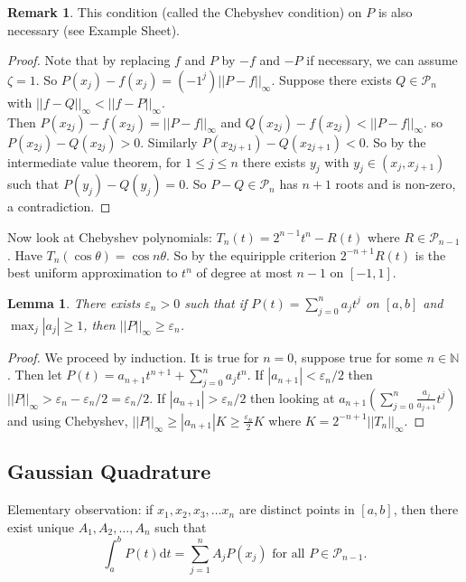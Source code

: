\documentclass[a4paper, 10pt, twocolumn]{amsart}
\newtheorem*{lemma}{Lemma}
\theoremstyle{definition}
\newtheorem*{remark}{Remark}
\newcommand{\bb}[1]{\mathbb{#1}}
\newcommand{\eps}[0]{\varepsilon}
\renewcommand{\cal}[1]{\mathcal{#1}}
\newcommand{\1}{\mathbbm{1}}
\begin{document}
\begin{remark}
    This condition (called the Chebyshev condition) on $P$ is also necessary (see Example Sheet).
\end{remark}

\begin{proof}
    Note that by replacing $f$ and $P$ by $-f$ and $-P$ if necessary, we can assume $\zeta=1$. So $P(x_j)-f(x_j) = (-1^j) ||P-f||_\infty$. Suppose there exists $Q \in \cal{P}_n$ with $||f-Q||_\infty < ||f-P||_\infty$.\\
    
    Then $P(x_{2j})-f(x_{2j}) = ||P-f||_\infty$ and $Q(x_{2j})-f(x_{2j}) < ||P-f||_\infty$. so $P(x_{2j})-Q(x_{2j}) > 0$. Similarly $P(x_{2j+1})-Q(x_{2j+1}) < 0$. So by the intermediate value theorem, for $1\le j\le n$ there exists $y_j$ with $y_j \in (x_{j},x_{j+1})$ such that $P(y_j)-Q(y_j) = 0$. So $P-Q \in \cal{P}_{n}$ has $n+1$ roots and is non-zero, a contradiction.
\end{proof}

Now look at Chebyshev polynomials: $T_n(t) = 2^{n-1}t^n-R(t)$ where $R \in \cal{P}_{n-1}$. Have $T_n(\cos{\theta}) = \cos{n\theta}$. So by the equiripple criterion $2^{-n+1}R(t)$ is the best uniform approximation to $t^n$ of degree at most $n-1$ on $[-1,1]$.

\begin{lemma}
    There exists $\eps_n>0$ such that if $P(t) = \sum_{j=0}^n a_jt^j$ on $[a,b]$ and $\max_j |a_j| \ge 1$, then $||P||_\infty \ge \eps_n$. 
\end{lemma}

\begin{proof}
    We proceed by induction. It is true for $n=0$, suppose true for some $n \in \bb{N}$. Then let $P(t) = a_{n+1}t^{n+1}+ \sum_{j=0}^n a_j t^n$. If $|a_{n+1}| < \eps_n/2$ then $||P||_\infty > \eps_n-\eps_n/2 = \eps_n/2$. If $|a_{n+1}| > \eps_{n}/2$ then looking at $a_{n+1}\left(\sum_{j=0}^n \frac{a_{j}}{a_{j+1}} t^j\right)$ and using Chebyshev, $||P||_\infty \ge |a_{n+1}| K \ge \frac{\eps_{n}}{2} K$ where $K = 2^{-n+1}||T_n||_\infty$. 
\end{proof}

\subsection*{Gaussian Quadrature}

Elementary observation: if $x_1,x_2,x_3,\ldots x_n$ are distinct points in $[a,b]$, then there exist unique $A_1,A_2,\ldots,A_n$ such that \[\int_{a}^b P(t) \mathrm{d}t = \sum_{j=1}^n A_jP(x_j) \text{ for all } P \in \cal{P}_{n-1}.\]
\end{document}
